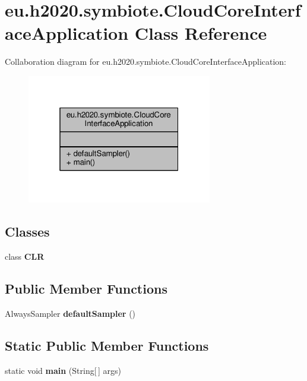 \hypertarget{classeu_1_1h2020_1_1symbiote_1_1CloudCoreInterfaceApplication}{}\section{eu.\+h2020.\+symbiote.\+Cloud\+Core\+Interface\+Application Class Reference}
\label{classeu_1_1h2020_1_1symbiote_1_1CloudCoreInterfaceApplication}


Collaboration diagram for eu.\+h2020.\+symbiote.\+Cloud\+Core\+Interface\+Application\+:\nopagebreak
\begin{figure}[H]
\begin{center}
\leavevmode
\includegraphics[width=229pt]{classeu_1_1h2020_1_1symbiote_1_1CloudCoreInterfaceApplication__coll__graph}
\end{center}
\end{figure}
\subsection*{Classes}
\begin{DoxyCompactItemize}
\item 
class {\bfseries C\+LR}
\end{DoxyCompactItemize}
\subsection*{Public Member Functions}
\begin{DoxyCompactItemize}
\item 
\mbox{\label{classeu_1_1h2020_1_1symbiote_1_1CloudCoreInterfaceApplication_a12ccc55e03aebfb165dd037cefc9bb78}} 
Always\+Sampler {\bfseries default\+Sampler} ()
\end{DoxyCompactItemize}
\subsection*{Static Public Member Functions}
\begin{DoxyCompactItemize}
\item 
\mbox{\label{classeu_1_1h2020_1_1symbiote_1_1CloudCoreInterfaceApplication_a19264807749c01cd7938facb44578f43}} 
static void {\bfseries main} (String\mbox{[}$\,$\mbox{]} args)
\end{DoxyCompactItemize}



